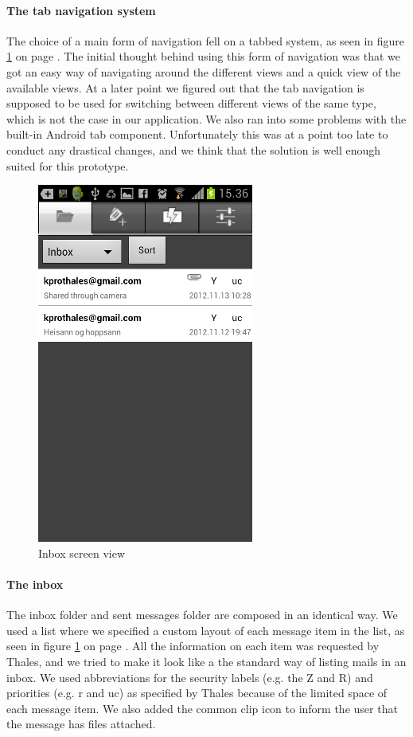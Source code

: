 \paragraph{The tab navigation system}\hfill
\newline
The choice of a main form of navigation fell on a tabbed system, as seen in figure \ref{fig:frontend_inbox} on page \pageref{fig:frontend_inbox}. The initial thought behind using this form of navigation was that we got an easy way of navigating around the different views and a quick view of the available views.
At a later point we figured out that the tab navigation is supposed to be used for switching between different views of the same type, which is not the case in our application. We also ran into some problems with the built-in Android tab component. Unfortunately this was at a point too late to conduct any drastical changes, and we think that the solution is well enough suited for this prototype.

\begin{figure}[H]
\begin{center}
\includegraphics{inbox_final}
\end{center}
\caption{Inbox screen view} \label{fig:frontend_inbox}
\end{figure}

\paragraph{The inbox}\hfill
\newline
The inbox folder and sent messages folder are composed in an identical way. We used a list where we specified a custom layout of each message item in the list, as seen in figure \ref{fig:frontend_inbox} on page \pageref{fig:frontend_inbox}. All the information on each item was requested by Thales, and we tried to make it look like a the standard way of listing mails 
in an inbox. We used abbreviations for the security labels (e.g. the Z and R) and priorities (e.g. r and uc) as specified by Thales because of the limited space of each message item. We also added the common clip icon to inform the user that the message has files attached. 

